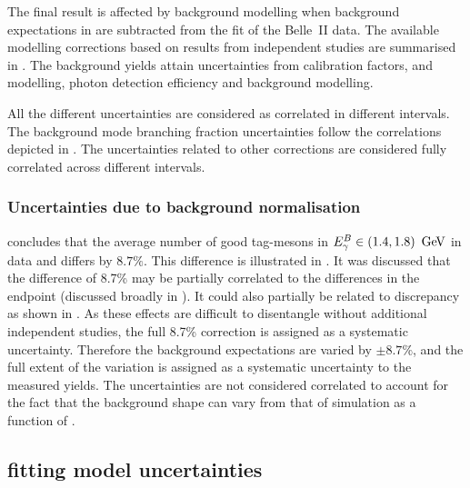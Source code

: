 The final result is affected by background modelling when background expectations in \MC are subtracted from the \Mbc fit of the Belle~II data.
The available modelling corrections based on results from independent studies are summarised in .
The background yields attain uncertainties from \FEI calibration factors, \piVeto and \etaVeto modelling, photon detection efficiency and background modelling. 

All the different uncertainties are considered as correlated in different \EB intervals.
The background mode branching fraction uncertainties follow the correlations depicted in .
The uncertainties related to other corrections are considered fully correlated across different \EB intervals.

\subsubsection{Uncertainties due to background normalisation}\label{sec:background_normalisation_systematic}

 concludes that the average number of 
good tag-\B mesons in ${E^B_{\gamma}}\in(1.4,1.8)~\mathrm{\,Ge\kern -0.1em V}$ in data and \MC differs by $8.7\%$.
This difference is illustrated in .
It was discussed that the difference of 8.7\% may be partially correlated to the differences in the \Mbc endpoint (discussed broadly in ).
It could also partially be related to \ZMVA discrepancy as shown in .
As these effects are difficult to disentangle without additional independent studies, the full 8.7\% correction is assigned as a systematic uncertainty.
Therefore the background expectations are varied by $\pm 8.7\%$, and the full extent of the variation is assigned as a systematic uncertainty to the measured \BtoXsgamma yields.
The uncertainties are not considered correlated to account for the fact that the background shape can vary from that of simulation as a function of \EB.



\subsection{\texorpdfstring{\Mbc}{Mbc} fitting model uncertainties}\label{sec:fit_uncertainties}

